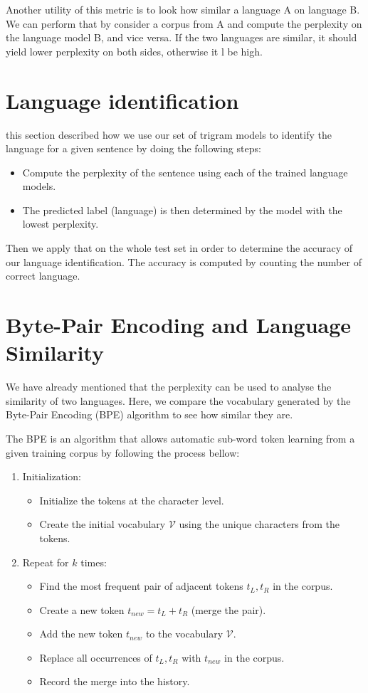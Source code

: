 Another utility of this metric is to look how similar a language A on language B. We can perform that by consider a corpus from A and compute the perplexity on the language model B, and vice versa. If the two languages are similar, it should yield lower perplexity on both sides, otherwise it l be high.
\section{Language identification}
this section described how we use our set of trigram models to identify the language for a given sentence by doing the following steps:
\begin{itemize}
    \item Compute the perplexity of the sentence using each of the trained language models.
    \item The predicted label (language) is then determined by the model with the lowest perplexity.
\end{itemize}
Then we apply that on the whole test set in order to determine the accuracy of our language identification. The accuracy is computed by counting the number of correct language.
\section{Byte-Pair Encoding and Language Similarity}
We have already mentioned that the perplexity can be used to analyse the similarity of two languages. Here, we compare the vocabulary generated by the Byte-Pair Encoding (BPE) algorithm to see how similar they are.

The BPE is an algorithm that allows automatic sub-word token learning from a given training corpus by following the process bellow:
\begin{enumerate}
    \item Initialization:
    \begin{itemize}
    \item Initialize the tokens at the character level.
    \item Create the initial vocabulary $\mathcal{V}$ using the unique characters from the tokens.
    \end{itemize}

    \item Repeat for $k$ times:
    \begin{itemize}
        \item Find the most frequent pair of adjacent tokens $t_L, t_R$ in the corpus.
        \item Create a new token $t_{new} = t_L + t_R$ (merge the pair).
        \item Add the new token $t_{new}$ to the vocabulary $\mathcal{V}$.
        \item Replace all occurrences of $t_L, t_R$ with $t_{new}$ in the corpus.
        \item Record the merge into the history.
    \end{itemize}
\end{enumerate}

